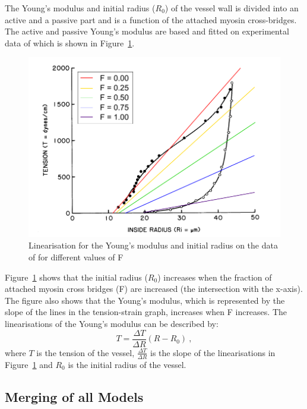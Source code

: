 The Young's modulus and initial radius ($R_0$) of the vessel wall is divided into an active and a passive part and is a function of the attached myosin cross-bridges. The active and passive Young's modulus are based and fitted on experimental data of \citet{Gore} which is shown in Figure~\ref{fig:LinearisationRadius}. 

\begin{figure}[h!]
  \centering
  \includegraphics[width = 12 cm]{pics/LinearisationRadius.pdf}
  \caption{Linearisation for the Young's modulus and initial radius on the data of \citet{Gore} for different values of F}
  \label{fig:LinearisationRadius}
\end{figure}

Figure~\ref{fig:LinearisationRadius} shows that the initial radius ($R_0$) increases when the fraction of attached myosin cross bridges (F) are increased (the intersection with the x-axis). The figure also shows that the Young's modulus, which is represented by the slope of the lines in the tension-strain graph, increases when F increases. The linearisations of the Young's modulus can be described by:
\begin{equation} \label{eq:Fbalans4}
T=\frac{\Delta T}{\Delta R}(R-R_0)~,
\end{equation}
where $T$ is the tension of the vessel, $\frac{\Delta T}{\Delta R}$ is the slope of the linearisations in Figure~\ref{fig:LinearisationRadius} and $R_0$ is the initial radius of the vessel. \\

\newpage
\subsection{Merging of all Models}

